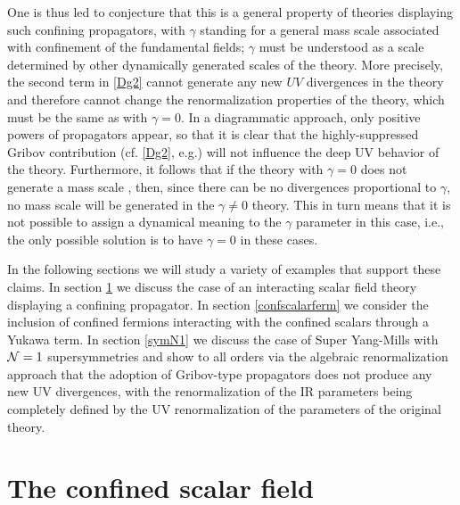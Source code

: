 One is thus led to conjecture that this is a general property of theories displaying such
confining propagators, with $\gamma$ standing for a general mass scale associated with
confinement of the fundamental fields; $\gamma$ must be understood as a scale determined by
other dynamically generated scales of the theory. More precisely, the second term in
\eqref{Dg2} cannot generate any new $UV$ divergences in the theory and therefore cannot change
the renormalization properties of the theory, which must be the same as with $\gamma = 0$. In a
diagrammatic approach, only positive powers of propagators appear, so that it is clear that the
highly-suppressed Gribov contribution (cf. \eqref{Dg2}, e.g.) will not influence the deep UV
behavior of the theory. Furthermore, it follows that if the theory with $\gamma = 0$ does not
generate a mass scale , then, since there can be no divergences proportional to $\gamma$, no
mass scale will be generated in the  $\gamma \neq 0$ theory. This in turn means that it is not
possible to assign a dynamical meaning to the $\gamma$ parameter in this case, i.e., the only
possible solution is to have  $\gamma = 0$ in these cases.

In the following sections we will study a variety of examples that support these claims. In section \ref{confscalar} we discuss the case of an interacting scalar field theory displaying a confining propagator. In section 
\ref{confscalarferm} we consider the inclusion of confined fermions interacting with the confined scalars through a Yukawa term. In section \ref{symN1} we discuss the case of Super Yang-Mills with ${\cal N} =1$ supersymmetries
and show to all orders via the algebraic renormalization approach that the adoption of Gribov-type propagators does not produce any new UV divergences, with the renormalization of the IR parameters being completely defined by the UV renormalization of the parameters of the original theory. 






\section{The confined scalar field}
\label{confscalar}


